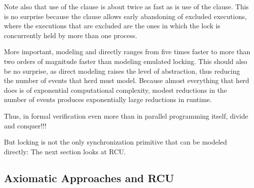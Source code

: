 {	Note also that use of the  clause is about twice
	as fast as is use of the  clause.
	This is no surprise because the  clause allows
	early abandoning of excluded executions, where the executions
	that are excluded are the ones in which the lock is concurrently
	held by more than one process.

	More important, modeling  and 
	directly ranges from five times faster to more than two orders
	of magnitude faster than modeling emulated locking.
	This should also be no surprise, as direct modeling raises
	the level of abstraction, thus reducing the number of events
	that herd must model.
	Because almost everything that herd does is of exponential
	computational complexity, modest reductions in the number of
	events produces exponentially large reductions in runtime.

	Thus, in formal verification even more than in parallel
	programming itself, divide and conquer!!!
}\QuickQuizEnd

But locking is not the only synchronization primitive that can be
modeled directly:
The next section looks at RCU.

\subsection{Axiomatic Approaches and RCU}
\label{sec:formal:Axiomatic Approaches and RCU}

